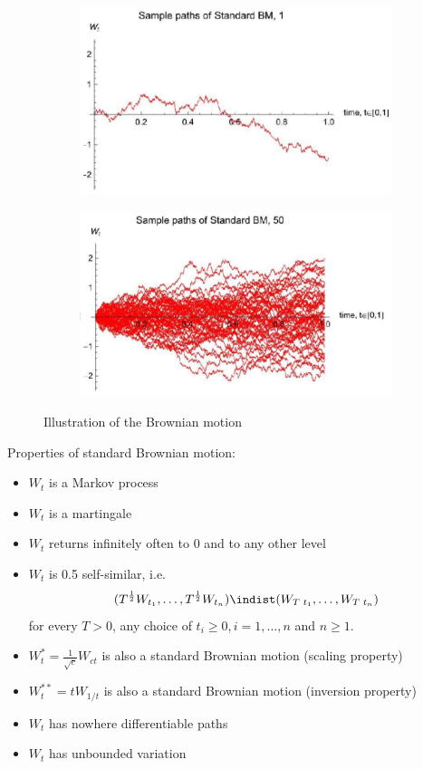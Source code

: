 \documentclass[11pt,a4paper]{book}
\theoremstyle{definition}\newtheorem{definition}{Definition}
\theoremstyle{definition}\newtheorem{fact}{Fact}
\theoremstyle{definition}\newtheorem{remark}{Remark}
\theoremstyle{definition}\newtheorem{ex}{Ex.}
\theoremstyle{definition}\newtheorem{project}{Project}
\theoremstyle{definition}\newtheorem{problem}{Problem}
\theoremstyle{definition}\newtheorem{example}{Example}
\numberwithin{theorem}{section}
\numberwithin{corollary}{chapter}
\numberwithin{assumption}{chapter}
\numberwithin{definition}{chapter}
\numberwithin{prop}{chapter}
\numberwithin{notation}{chapter}
\numberwithin{problem}{chapter}
\numberwithin{example}{chapter}
\numberwithin{fact}{chapter}
\numberwithin{ex}{chapter}
\begin{document}
\begin{figure}[H]
	\begin{subfigure}{0.5\textwidth}
		\centering
		\includegraphics[scale=0.5]{Chapter01/Chapter1_2.png}
	\end{subfigure}
	\begin{subfigure}{0.5\textwidth}
		\centering
		\includegraphics[scale=0.5]{Chapter01/Chapter1_3.png}
	\end{subfigure}
	\caption{Illustration of the Brownian motion}
\end{figure}

Properties of standard Brownian motion:
\begin{itemize}
\item $W_t$ is a Markov process
\item $W_t$ is a martingale
\item $W_t$ returns infinitely often to 0 and to any other level
\item $W_t$ is 0.5 self-similar, i.e.
$$(T^{\frac{1}{2}} W_{t_1}, \ldots, T^{\frac{1}{2}} W_{t_n}) \indist (W_{T\,\,t_1}, \ldots, W_{T\,\,t_n})$$
for every $T>0$, any choice of $t_i \geq 0, i = 1, ..., n$ and $n \geq 1$.
\item $W_t^* = \frac{1}{\sqrt{c}} W_{ct}$ is also a standard Brownian motion (scaling property)
\item $W_t^{{**}} = t W_{1/t}$ is also a standard Brownian motion (inversion property)
\item $W_t$ has nowhere differentiable paths
\item $W_t$ has unbounded variation
\end{itemize}
\end{document}
